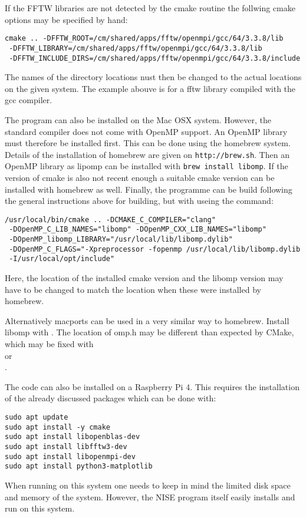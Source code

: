 If the FFTW libraries are not detected by the cmake routine the follwing cmake options may be specified by hand:
\begin{lstlisting}[style=mystyle]
cmake .. -DFFTW_ROOT=/cm/shared/apps/fftw/openmpi/gcc/64/3.3.8/lib
 -DFFTW_LIBRARY=/cm/shared/apps/fftw/openmpi/gcc/64/3.3.8/lib
 -DFFTW_INCLUDE_DIRS=/cm/shared/apps/fftw/openmpi/gcc/64/3.3.8/include
\end{lstlisting}
The names of the directory locations nust then be changed to the actual locations on the given system.  The example abouve is for a fftw library compiled with the gcc compiler.

The program can also be installed on the Mac OSX system. However, the standard compiler does not come with OpenMP support. An OpenMP library must therefore be installed first. This can be done using the homebrew system. Details of the installation of homebrew are given on \texttt{http://brew.sh}. Then an OpenMP library as lipomp can be installed with \texttt{brew install libomp}. If the version of cmake is also not recent enough a suitable cmake version can be installed with homebrew as well. Finally, the programme can be build following the general instructions above for building, but with useing the command:
\begin{lstlisting}[style=mystyle]
/usr/local/bin/cmake .. -DCMAKE_C_COMPILER="clang"
 -DOpenMP_C_LIB_NAMES="libomp" -DOpenMP_CXX_LIB_NAMES="libomp"
 -DOpenMP_libomp_LIBRARY="/usr/local/lib/libomp.dylib"
 -DOpenMP_C_FLAGS="-Xpreprocessor -fopenmp /usr/local/lib/libomp.dylib
 -I/usr/local/opt/include"
\end{lstlisting}
Here, the location of the installed cmake version and the libomp version may have to be changed to match the location when these were installed by homebrew.

Alternatively macports can be used in a very similar way to homebrew. Install libomp with . The location of omp.h may be different than expected by CMake, which may be fixed with\\  or\\ .

The code can also be installed on a Raspberry Pi 4. This requires the installation of the already discussed packages which can be done with:
\begin{lstlisting}[style=mystyle]
sudo apt update
sudo apt install -y cmake
sudo apt install libopenblas-dev
sudo apt install libfftw3-dev
sudo apt install libopenmpi-dev
sudo apt install python3-matplotlib
\end{lstlisting}
When running on this system one needs to keep in mind the limited disk space and memory of the system. However, the NISE program itself easily installs and run on this system. 

